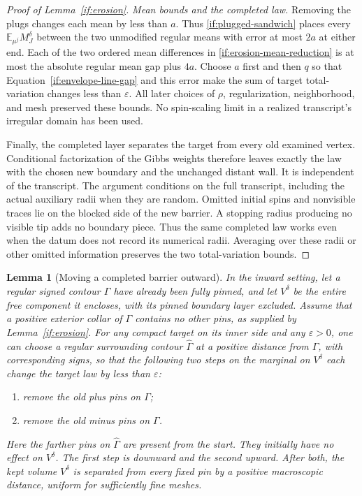 \documentclass[11pt]{article}
\newtheorem{lemma}[theorem]{Lemma}
\theoremstyle{definition}
\theoremstyle{remark}
\numberwithin{equation}{section}
\begin{document}
\begin{proof}[Proof of Lemma~\ref{if:erosion}]
\emph{Mean bounds and the completed law.}
Removing the plugs changes each mean by less than $a$. Thus
\eqref{if:plugged-sandwich} places every
$\mathbb E_{\mu^j}M_J^\delta$ between the two unmodified regular
means with error at most $2a$ at either end. Each of the two ordered
mean differences in \eqref{if:erosion-mean-reduction} is at most
the absolute regular mean gap plus $4a$. Choose $a$ first and then
$q$ so that Equation~\eqref{if:envelope-line-gap} and this error
make the sum of target total-variation changes less than
$\varepsilon$. All later choices of $\rho$, regularization,
neighborhood, and mesh preserved these bounds. No spin-scaling
limit in a realized transcript's irregular domain has been used.

Finally, the completed layer separates the target from every old
examined vertex. Conditional factorization of the Gibbs weights
therefore leaves exactly the law with the chosen new boundary and
the unchanged distant wall. It is independent of the transcript.
The argument conditions on the full transcript, including the
actual auxiliary radii when they are random. Omitted initial spins
and nonvisible traces lie on the blocked side of the new barrier.
A stopping radius producing no visible tip adds no boundary piece.
Thus the same completed law works even when the datum does not
record its numerical radii. Averaging over these radii or other
omitted information preserves the two total-variation bounds.
\end{proof}

\begin{lemma}[Moving a completed barrier outward]
\label{if:barrier-buffer}
In the inward setting, let a regular signed contour $\Gamma$
have already been fully pinned, and let $V^\delta$ be the entire
free component it encloses, with its pinned boundary layer excluded.
Assume that a positive exterior collar of $\Gamma$ contains no other
pins, as supplied by Lemma~\ref{if:erosion}.
For any compact target on its inner side and any $\varepsilon>0$,
one can choose a regular surrounding contour $\widehat\Gamma$
at a positive distance from $\Gamma$, with corresponding signs,
so that the following two steps on the marginal on $V^\delta$
each change the target law by less than $\varepsilon$:
\begin{enumerate}
\item remove the old plus pins on $\Gamma$;
\item remove the old minus pins on $\Gamma$.
\end{enumerate}
Here the farther pins on $\widehat\Gamma$ are present from the start.
They initially have no effect on $V^\delta$.  The first step is
downward and the second upward.  After both, the kept volume
$V^\delta$ is separated from every fixed pin by a positive
macroscopic distance, uniform for sufficiently fine meshes.
\end{lemma}
\end{document}
